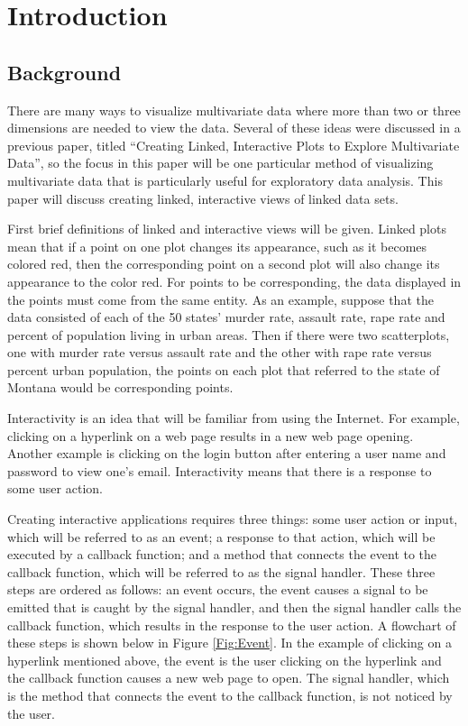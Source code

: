 \documentclass{article}[11pt]
\begin{document}
\section{Introduction}\label{Sec:Intro}

\subsection{Background}\label{Ssec:Backg}

There are many ways to visualize multivariate data where more than
two or three dimensions are needed to view the data.  Several of these ideas
were discussed in a previous paper, titled ``Creating Linked, Interactive
Plots to Explore Multivariate Data'', so the focus in this paper will be one
particular method of visualizing multivariate data that is particularly useful
for exploratory data analysis.  This paper will discuss creating linked,
interactive views of linked data sets.  

First brief definitions of linked and interactive views will be given.  Linked
plots mean that if a point on one plot changes its appearance, such as it
becomes colored red, then the corresponding point on a second plot will also
change its appearance to the color red.  For points to be corresponding, the
data displayed in the points must come from the same entity.  As an example,
suppose that the data consisted of each of the 50 states' murder rate, assault
rate, rape rate and percent of population living in urban areas.  Then if
there were two scatterplots, one with murder rate versus assault rate and the
other with rape rate versus percent urban population, the points on each plot
that referred to the state of Montana would be corresponding points.

Interactivity is an idea that will be familiar from using the Internet.  For
example, clicking on a hyperlink on a web page results in a new web page
opening.  Another example is clicking on the login button after entering a
user name and password to view one's email.  Interactivity means that there is
a response to some user action.  

Creating interactive applications requires three
things: some user action or input, which will be referred to as an
event; a response to that action, which will be executed by a callback
function; and a method that connects the event to the callback
function, which will be referred to as the signal handler.  These
three steps are ordered as follows: an event occurs, the event causes a
signal to be emitted that is caught by the signal handler, and then
the signal handler calls the callback function, which results in the
response to the user action.  A flowchart of these steps is shown
below in Figure \ref{Fig:Event}.  In the example of clicking on a
hyperlink mentioned above, the event is the user clicking on the
hyperlink and the callback function causes a new web page to open.
The signal handler, which is the method that connects the event to the
callback function, is not noticed by the user.  
\end{document}
